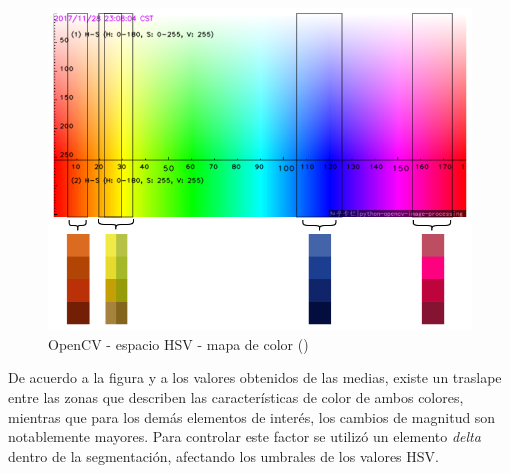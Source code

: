 \begin{figure}[ht]
    \centering
    \includegraphics[scale=0.4]{Figures/PieceColors_HSVColorMap.png}
        \caption{OpenCV - espacio HSV - mapa de color (\cite{pai_adityapai2398colour-segmentation--opencv_2022})}
        \label{fig:ColorMapHSVOpenCV}
\end{figure}

De acuerdo a la figura y a los valores obtenidos de las medias, existe un traslape entre las zonas que describen las características de color de ambos colores, mientras que para los demás elementos de interés, los cambios de magnitud son notablemente mayores. Para controlar este factor se utilizó un elemento \textit{delta} dentro de la segmentación, afectando los umbrales de los valores HSV.

